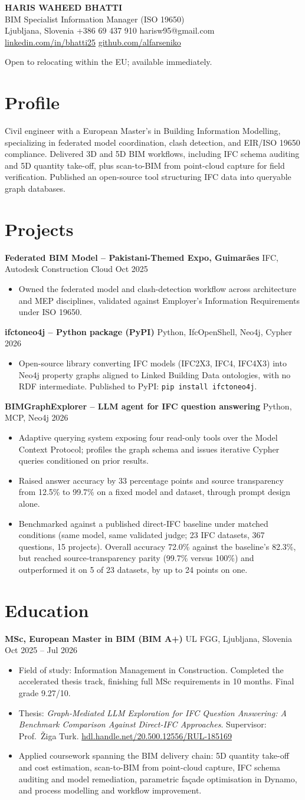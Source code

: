 \documentclass[a4paper,10.5pt]{article}
\newcommand{\datefill}{\dotfill}
\newcommand{\entry}[3]{\vspace{2.5pt}\noindent\textbf{#1} \textbar{} #2 \datefill{} #3\par\vspace{0.5pt}}
\newcommand{\ROLELINE}{BIM Specialist \textbar{} Information Manager (ISO 19650)}
\newcommand{\projIfcToNeo}{%
\entry{ifctoneo4j -- Python package (PyPI)}{Python, IfcOpenShell, Neo4j, Cypher}{2026}
\begin{itemize}
  \item Open-source library converting IFC models (IFC2X3, IFC4, IFC4X3) into Neo4j
        property graphs aligned to Linked Building Data ontologies, with no RDF
        intermediate. Published to PyPI: \texttt{pip install ifctoneo4j}.
\end{itemize}}
\newcommand{\projBIMGraph}{%
\entry{BIMGraphExplorer -- LLM agent for IFC question answering}{Python, MCP, Neo4j}{2026}
\begin{itemize}
  \item Adaptive querying system exposing four read-only tools over the Model
        Context Protocol; profiles the graph schema and issues iterative Cypher
        queries conditioned on prior results.
  \item Raised answer accuracy by 33 percentage points and source transparency from
        12.5\% to 99.7\% on a fixed model and dataset, through prompt design alone.
  \item Benchmarked against a published direct-IFC baseline under matched
        conditions (same model, same validated judge; 23 IFC datasets, 367
        questions, 15 projects). Overall accuracy 72.0\% against the baseline's
        82.3\%, but reached source-transparency parity (99.7\% versus 100\%) and
        outperformed it on 5 of 23 datasets, by up to 24 points on one.
\end{itemize}}
\newcommand{\projGuimaraes}{%
\entry{Federated BIM Model -- Pakistani-Themed Expo, Guimar\~aes}{IFC, Autodesk Construction Cloud}{Oct 2025}
\begin{itemize}
  \item Owned the federated model and clash-detection workflow across architecture
        and MEP disciplines, validated against Employer's Information Requirements
        under ISO 19650.
\end{itemize}}
\begin{document}
\begin{center}
  {\LARGE\bfseries HARIS WAHEED BHATTI}\\[2pt]
  {\large \ROLELINE}\\[3pt]
  Ljubljana, Slovenia \textbar{} +386 69 437 910 \textbar{} harisw95@gmail.com\\
  \href{https://linkedin.com/in/bhatti25}{linkedin.com/in/bhatti25} \textbar{}
  \href{https://github.com/alfarseniko}{github.com/alfarseniko}
\end{center}
\vspace{-4pt}
\noindent\small Open to relocating within the EU; available immediately.\normalsize

\section{Profile}

\noindent Civil engineer with a European Master's in Building Information Modelling,
specializing in federated model coordination, clash detection, and EIR/ISO 19650
compliance. Delivered 3D and 5D BIM workflows, including IFC schema auditing and 5D
quantity take-off, plus scan-to-BIM from point-cloud capture for field verification.
Published an open-source tool structuring IFC data into queryable graph databases.

\section{Projects}

 \projGuimaraes \projIfcToNeo \projBIMGraph

\section{Education}
\entry{MSc, European Master in BIM (BIM A+)}{UL FGG, Ljubljana, Slovenia}{Oct 2025 -- Jul 2026}
\begin{itemize}
  \item Field of study: Information Management in Construction. Completed the
        accelerated thesis track, finishing full MSc requirements in 10 months.
        Final grade 9.27/10.
  \item Thesis: \textit{Graph-Mediated LLM Exploration for IFC Question Answering:
        A Benchmark Comparison Against Direct-IFC Approaches}. Supervisor:
        Prof.~\v{Z}iga Turk. \href{http://hdl.handle.net/20.500.12556/RUL-185169}{hdl.handle.net/20.500.12556/RUL-185169}
  \item Applied coursework spanning the BIM delivery chain: 5D quantity take-off and cost estimation, scan-to-BIM from point-cloud capture, IFC schema auditing and model remediation, parametric façade optimisation in Dynamo, and process modelling and workflow improvement.
\end{itemize}
\end{document}
